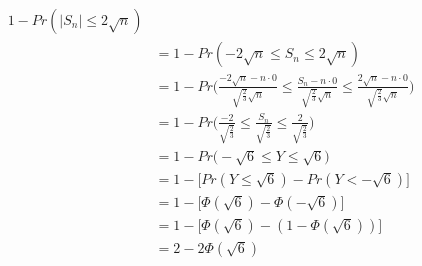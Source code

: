 \documentclass[a4paper, 11pt, oneside]{article}
\newcommand\abs[1]{\left|#1\right|}
\begin{document}
\begin{enumerate}
\begin{enumerate}
\begin{align*}
 1 - Pr(\abs{S_n} \leq 2\sqrt{n}) \\&=
 1 - Pr(-2\sqrt{n} \leq S_n \leq 2\sqrt{n}) \\&=
 1 - Pr\Bigg(\frac{-2\sqrt{n} - n \cdot 0}{\sqrt{\frac{2}{3}}\sqrt{n}} \leq \frac{S_n - n \cdot 0}{\sqrt{\frac{2}{3}}\sqrt{n}} \leq \frac{2\sqrt{n} - n \cdot 0}{\sqrt{\frac{2}{3}}\sqrt{n}}\Bigg) \\&=
 1 - Pr\Bigg(\frac{-2}{\sqrt{\frac{2}{3}}} \leq \frac{S_n}{\sqrt{\frac{2}{3}}} \leq \frac{2}{\sqrt{\frac{2}{3}}}\Bigg)\\&=
 1 - Pr\Bigg(-\sqrt{6} \leq Y \leq \sqrt{6}\Bigg)\\&=
 1 - \Big[Pr(Y \leq \sqrt{6}) - Pr(Y < -\sqrt{6})\Big] \\&=
 1 - \Big[\Phi(\sqrt{6}) -\Phi(-\sqrt{6})\Big] \\&=
 1 - \Big[\Phi(\sqrt{6}) - (1 - \Phi(\sqrt{6}))\Big] \\&=
 2 - 2\Phi(\sqrt{6})
 \end{align*}
\end{enumerate}

\end{enumerate}

\begin{thebibliography}{9} 

\end{thebibliography}
\end{document}
